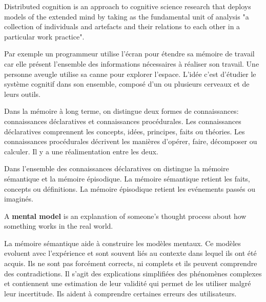 Distributed cognition is an approach to cognitive science research that deploys models of the extended mind by taking as the fundamental unit of analysis "a collection of individuals and artefacts and their relations to each other in a particular work practice".

Par exemple un programmeur utilise l'\'ecran pour \'etendre sa m\'emoire de travail car elle pr\'esent l'ensemble des informations n\'ecessaires \`a r\'ealiser son travail. Une personne aveugle utilise sa canne pour explorer l'espace. L'id\'ee c'est d'\'etudier le syst\`eme cognitif dans son ensemble, compos\'e d'un ou plusieurs cerveaux et de leurs outils.

Dans la m\'emoire \`a long terme, on distingue deux formes de connaissances: connaissances d\'eclaratives et connaissances proc\'edurales. Les connaissances d\'eclaratives comprennent les concepts, id\'ees, principes, faits ou th\'eories. Les connaissances proc\'edurales d\'ecrivent les mani\`eres d'op\'erer, faire, d\'ecomposer ou calculer. Il y a une r\'ealimentation entre les deux. 

Dans l'ensemble des connaissances d\'eclaratives on distingue la m\'emoire s\'emantique et la m\'emoire \'episodique. La m\'emoire s\'emantique retient les faits, concepts ou d\'efinitions. La m\'emoire \'episodique retient les ev\'enements pass\'es ou imagin\'es. 

\begin{figure}[H]
\centering
{}
\end{figure}

A \textbf{mental model} is an explanation of someone's thought process about how something works in the real world.

La m\'emoire s\'emantique aide \`a construire les mod\`eles mentaux. Ce mod\`eles evoluent avec l'exp\'erience et sont souvent li\'es au contexte dans lequel ils ont \'et\'e acquis. Ils ne sont pas forc\'ement corrects, ni complets et ils peuvent comprendre des contradictions. Il s'agit des explications simplifi\'ees des ph\'enom\`enes complexes et contiennent une estimation de leur validit\'e qui permet de les utiliser malgr\'e leur incertitude. Ils aident \`a comprendre certaines erreurs des utilisateurs.

